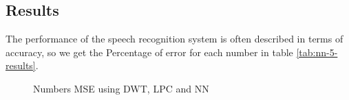 \documentclass[12pt, a4paper, twoside]{report}
\begin{document}
\subsection{Results}
The performance of the speech recognition system is often described in terms of accuracy, so we get the Percentage of error for each number in table \ref{tab:nn-5-results}.
\begin{figure}[!h]
\begin{floatrow}
{%
  \caption{Numbers MSE using DWT, LPC and NN}
  \label{fig:nn-mse-1}
}
\end{floatrow}
\end{figure}
\end{document}
